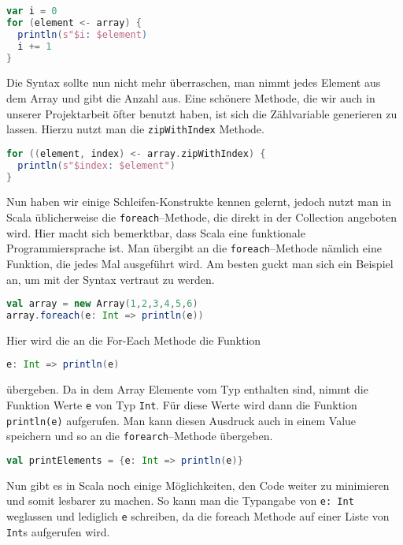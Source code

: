 \begin{lstlisting}[language=Scala,caption=For--Each in Scala]
var i = 0
for (element <- array) {
  println(s"$i: $element)
  i += 1
}
\end{lstlisting}

Die Syntax sollte nun nicht mehr überraschen, man nimmt jedes Element aus dem Array und gibt die Anzahl aus. Eine schönere Methode, die wir auch in unserer Projektarbeit öfter benutzt haben, ist sich die Zählvariable generieren zu lassen. Hierzu nutzt man die \texttt{zipWithIndex} Methode.

\begin{lstlisting}[language=Scala]
for ((element, index) <- array.zipWithIndex) {
  println(s"$index: $element")
}
\end{lstlisting}

Nun haben wir einige Schleifen-Konstrukte kennen gelernt, jedoch nutzt man in Scala üblicherweise die \texttt{foreach}--Methode, die direkt in der Collection angeboten wird. Hier macht sich bemerktbar, dass Scala eine funktionale Programmiersprache ist. Man übergibt an die \texttt{foreach}--Methode nämlich eine Funktion, die jedes Mal ausgeführt wird. Am besten guckt man sich ein Beispiel an, um mit der Syntax vertraut zu werden.

\begin{lstlisting}[language=Scala]
val array = new Array(1,2,3,4,5,6)
array.foreach(e: Int => println(e))
\end{lstlisting}

Hier wird die an die For-Each Methode die Funktion

\begin{lstlisting}[language=Scala,numbers=none]
e: Int => println(e)
\end{lstlisting}

übergeben. Da in dem Array Elemente vom Typ enthalten sind, nimmt die Funktion Werte \texttt{e} von Typ \texttt{Int}. Für diese Werte wird dann die Funktion \texttt{println(e)} aufgerufen. Man kann diesen Ausdruck auch in einem Value speichern und so an die \texttt{forearch}--Methode übergeben.

\begin{lstlisting}[language=Scala,numbers=none]
val printElements = {e: Int => println(e)}
\end{lstlisting}

Nun gibt es in Scala noch einige Möglichkeiten, den Code weiter zu minimieren und somit lesbarer zu machen. So kann man die Typangabe von \texttt{e: Int} weglassen und lediglich \texttt{e} schreiben, da die foreach Methode auf einer Liste von \texttt{Int}s aufgerufen wird.

